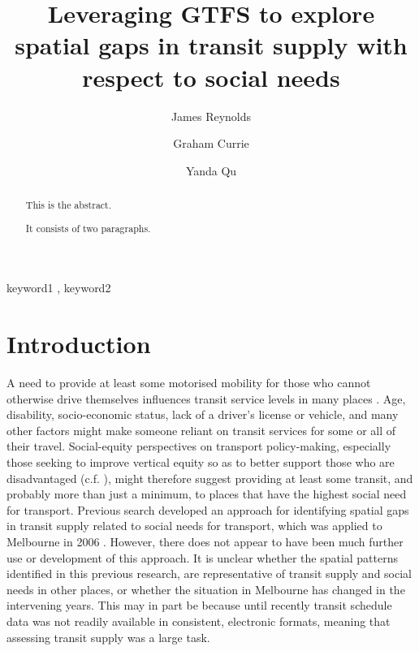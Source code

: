 \documentclass[preprint, 3p,
authoryear]{elsarticle} %
\begin{document}
\begin{frontmatter}

  \title{Leveraging GTFS to explore spatial gaps in transit supply with
respect to social needs}
    \author[Public Transport Research Group (PTRG)]{James Reynolds%
  }
    \author[Public Transport Research Group (PTRG)]{Graham Currie%
  }
    \author[Public Transport Research Group (PTRG)]{Yanda Qu%
  }
  
  \begin{abstract}
  This is the abstract.

  It consists of two paragraphs.
  \end{abstract}
    \begin{keyword}
    keyword1 \sep 
    keyword2
  \end{keyword}
  
 \end{frontmatter}

\hypertarget{introduction}{%
\section{Introduction}\label{introduction}}

A need to provide at least some motorised mobility for those who cannot
otherwise drive themselves influences transit service levels in many
places \citep{Currie:2016aa}. Age, disability, socio-economic status,
lack of a driver's license or vehicle, and many other factors might make
someone reliant on transit services for some or all of their travel.
Social-equity perspectives on transport policy-making, especially those
seeking to improve vertical equity so as to better support those who are
disadvantaged (c.f. \citet{Litman:2016aa}), might therefore suggest
providing at least some transit, and probably more than just a minimum,
to places that have the highest social need for transport. Previous
search developed an approach for identifying spatial gaps in transit
supply related to social needs for transport, which was applied to
Melbourne in 2006 \citep{Currie2007Identifying, currie2010identifying}.
However, there does not appear to have been much further use or
development of this approach. It is unclear whether the spatial patterns
identified in this previous research, are representative of transit
supply and social needs in other places, or whether the situation in
Melbourne has changed in the intervening years. This may in part be
because until recently transit schedule data was not readily available
in consistent, electronic formats, meaning that assessing transit supply
was a large task.
\end{document}
